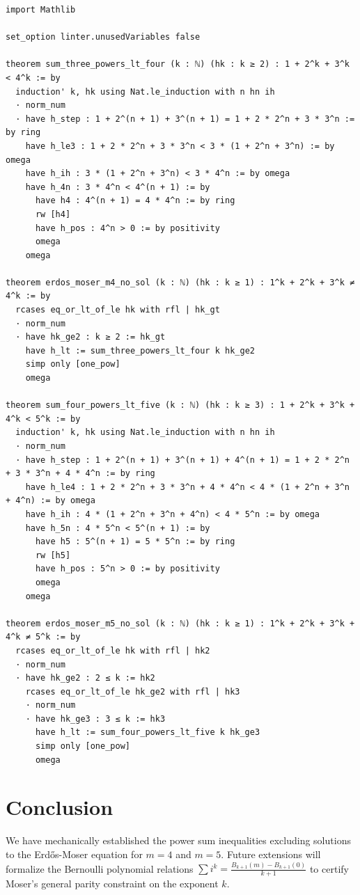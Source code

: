 \documentclass[11pt,a4paper]{article}
\theoremstyle{definition}
\begin{document}
\begin{lstlisting}[caption={Lean 4 Source Code for the Small $m$ Erd\H{o}s-Moser Exclusion Theorems}]
import Mathlib

set_option linter.unusedVariables false

theorem sum_three_powers_lt_four (k : ℕ) (hk : k ≥ 2) : 1 + 2^k + 3^k < 4^k := by
  induction' k, hk using Nat.le_induction with n hn ih
  · norm_num
  · have h_step : 1 + 2^(n + 1) + 3^(n + 1) = 1 + 2 * 2^n + 3 * 3^n := by ring
    have h_le3 : 1 + 2 * 2^n + 3 * 3^n < 3 * (1 + 2^n + 3^n) := by omega
    have h_ih : 3 * (1 + 2^n + 3^n) < 3 * 4^n := by omega
    have h_4n : 3 * 4^n < 4^(n + 1) := by
      have h4 : 4^(n + 1) = 4 * 4^n := by ring
      rw [h4]
      have h_pos : 4^n > 0 := by positivity
      omega
    omega

theorem erdos_moser_m4_no_sol (k : ℕ) (hk : k ≥ 1) : 1^k + 2^k + 3^k ≠ 4^k := by
  rcases eq_or_lt_of_le hk with rfl | hk_gt
  · norm_num
  · have hk_ge2 : k ≥ 2 := hk_gt
    have h_lt := sum_three_powers_lt_four k hk_ge2
    simp only [one_pow]
    omega

theorem sum_four_powers_lt_five (k : ℕ) (hk : k ≥ 3) : 1 + 2^k + 3^k + 4^k < 5^k := by
  induction' k, hk using Nat.le_induction with n hn ih
  · norm_num
  · have h_step : 1 + 2^(n + 1) + 3^(n + 1) + 4^(n + 1) = 1 + 2 * 2^n + 3 * 3^n + 4 * 4^n := by ring
    have h_le4 : 1 + 2 * 2^n + 3 * 3^n + 4 * 4^n < 4 * (1 + 2^n + 3^n + 4^n) := by omega
    have h_ih : 4 * (1 + 2^n + 3^n + 4^n) < 4 * 5^n := by omega
    have h_5n : 4 * 5^n < 5^(n + 1) := by
      have h5 : 5^(n + 1) = 5 * 5^n := by ring
      rw [h5]
      have h_pos : 5^n > 0 := by positivity
      omega
    omega

theorem erdos_moser_m5_no_sol (k : ℕ) (hk : k ≥ 1) : 1^k + 2^k + 3^k + 4^k ≠ 5^k := by
  rcases eq_or_lt_of_le hk with rfl | hk2
  · norm_num
  · have hk_ge2 : 2 ≤ k := hk2
    rcases eq_or_lt_of_le hk_ge2 with rfl | hk3
    · norm_num
    · have hk_ge3 : 3 ≤ k := hk3
      have h_lt := sum_four_powers_lt_five k hk_ge3
      simp only [one_pow]
      omega
\end{lstlisting}

\section{Conclusion}
We have mechanically established the power sum inequalities excluding solutions to the Erd\H{o}s-Moser equation for $m=4$ and $m=5$. Future extensions will formalize the Bernoulli polynomial relations $\sum i^k = \frac{B_{k+1}(m) - B_{k+1}(0)}{k+1}$ to certify Moser's general parity constraint on the exponent $k$.
\end{document}
